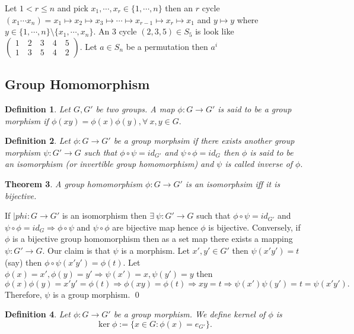 \documentclass[11pt]{amsart}
\newtheorem{theorem}{Theorem}[section]
\newtheorem{defn}[theorem]{Definition}
\begin{document}
Let $1<r\leq n$ and pick $x_1,\cdots,x_r\in \{1,\cdots,n\}$ then an $r$ cycle $(x_1\cdots x_n)=x_1\mapsto x_2\mapsto x_3\mapsto\cdots\mapsto x_{r-1}\mapsto x_r\mapsto x_1$ and $y\mapsto y$ where $y\in \{1,\cdots,n\}\setminus \{x_1,\cdots,x_n\}.$ An 3 cycle $(2,3,5)\in S_5$ is look like $\begin{pmatrix}
1\quad2\quad3\quad4\quad5\\
1\quad3\quad5\quad4\quad2
\end{pmatrix}$. Let $a\in S_n$ be a permutation then $a^i$


























\subsection{Group Homomorphism}
\begin{defn}
Let $G,G'$ be two groups. A map $\phi:G\to G'$ is said to be a group morphism if $\phi(xy)=\phi(x)\phi(y),\forall~x,y\in G.$
\end{defn}
\begin{defn}
Let $\phi:G\to G'$ be a group morphsim if there exists another group morphism $\psi:G'\to G$ such that $\phi\circ \psi=id_{G'}$ and $\psi\circ \phi=id_G$ then $\phi$ is said to be an isomorphism (or invertible group homomorphism) and $\psi$ is called inverse of $\phi.$
\end{defn}
\begin{theorem}
A group homomorphism $\phi:G\to G'$ is an isomorphsim iff it is bijective.
\end{theorem}
\proof If $|phi:G\to G'$ is an isomorphism then $\exists~\psi:G'\to G$ such that $\phi\circ \psi=id_{G'}$ and $\psi\circ \phi=id_G \Rightarrow \phi\circ \psi$ and $\psi\circ \phi$ are bijective map hence $\phi$ is bijective. Conversely, if $\phi$ is a bijective group homomorphism then as a set map there exists a mapping $\psi:G'\to G$. Our claim is that $\psi$ is a morphism. Let $x',y'\in G'$ then $\psi(x'y')=t$ (say) then $\phi\circ \psi(x'y')=\phi(t).$ Let $\phi(x)=x',\phi(y)=y' \Rightarrow \psi(x')=x,\psi(y')=y$ then $\phi(x)\phi(y)=x'y'=\phi(t) \Rightarrow \phi(xy)=\phi(t) \Rightarrow xy=t \Rightarrow \psi(x')\psi(y')=t=\psi(x'y').$ Therefore, $\psi$ is a group morphism. \qed
\begin{defn}
Let $\phi:G\to G'$ be a group morphism. We define kernel of $\phi$ is $$\ker\phi:=\{x\in G:\phi(x)=e_{G'}\}.$$
\end{defn}
\end{document}
